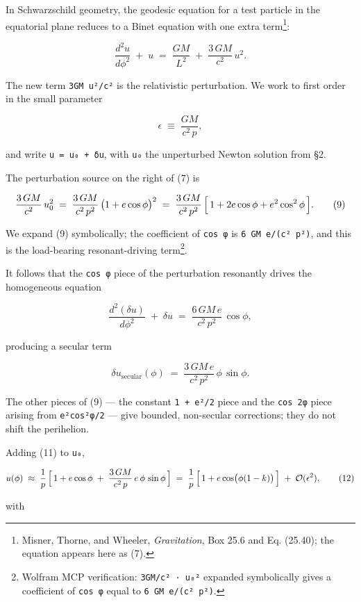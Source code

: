 \documentclass[
  11pt,
]{article}
\begin{document}
In Schwarzschild geometry, the geodesic equation for a test particle in
the equatorial plane reduces to a Binet equation with one extra
term\footnote{Misner, Thorne, and Wheeler, \emph{Gravitation}, Box 25.6
  and Eq. (25.40); the equation appears here as (7).}:

\[
\frac{d^{2} u}{d\phi^{2}} \;+\; u
\;=\; \frac{GM}{L^{2}}
\;+\; \frac{3\,GM}{c^{2}}\,u^{2}. \tag{7}
\]

The new term \texttt{3GM\ u²/c²} is the relativistic perturbation. We
work to first order in the small parameter

\[
\epsilon \;\equiv\; \frac{GM}{c^{2}\,p}, \tag{8}
\]

and write \texttt{u\ =\ u₀\ +\ δu}, with \texttt{u₀} the unperturbed
Newton solution from §2.

The perturbation source on the right of (7) is

\[
\frac{3\,GM}{c^{2}}\,u_{0}^{2}
\;=\; \frac{3\,GM}{c^{2}\,p^{2}}\,\bigl(1 + e\cos\phi\bigr)^{2}
\;=\; \frac{3\,GM}{c^{2}\,p^{2}}\,\Bigl[\,1 + 2e\cos\phi + e^{2}\cos^{2}\phi\,\Bigr]. \tag{9}
\]

We expand (9) symbolically; the coefficient of \texttt{cos\ φ} is
\texttt{6\ GM\ e/(c²\ p²)}, and this is the load-bearing
resonant-driving term\footnote{Wolfram MCP verification:
  \texttt{3GM/c²\ ·\ u₀²} expanded symbolically gives a coefficient of
  \texttt{cos\ φ} equal to \texttt{6\ GM\ e/(c²\ p²)}.}.

It follows that the \texttt{cos\ φ} piece of the perturbation resonantly
drives the homogeneous equation

\[
\frac{d^{2}(\delta u)}{d\phi^{2}} \;+\; \delta u \;=\; \frac{6\,GM\,e}{c^{2}\,p^{2}}\,\cos\phi, \tag{10}
\]

producing a secular term

\[
\delta u_{\text{secular}}(\phi)
\;=\; \frac{3\,GM\,e}{c^{2}\,p^{2}}\,\phi\,\sin\phi. \tag{11}
\]

The other pieces of (9) --- the constant \texttt{1\ +\ e²/2} piece and
the \texttt{cos\ 2φ} piece arising from \texttt{e²cos²φ/2} --- give
bounded, non-secular corrections; they do not shift the perihelion.

Adding (11) to \texttt{u₀},

\[
u(\phi) \;\approx\; \frac{1}{p}\,\Bigl[\,1 + e\cos\phi
\;+\; \frac{3\,GM}{c^{2}\,p}\,e\,\phi\,\sin\phi\,\Bigr]
\;=\; \frac{1}{p}\,\Bigl[\,1 + e\cos\bigl(\phi(1-k)\bigr)\,\Bigr]
\;+\; \mathcal{O}(\epsilon^{2}), \tag{12}
\]

with
\end{document}
